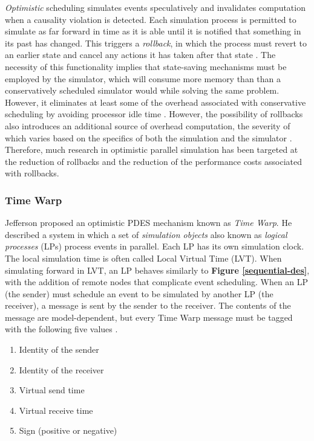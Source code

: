 \documentclass[11pt]{book}
\begin{document}
\textit{Optimistic} scheduling simulates events speculatively and invalidates
computation when a causality violation is detected. Each simulation process is
permitted to simulate as far forward in time as it is able until it is notified
that something in its past has changed. This triggers a \textit{rollback}, in
which the process must revert to an earlier state and cancel any actions it has
taken after that state \cite{nicol-93b}. The necessity of this functionality
implies that state-saving mechanisms must be employed by the simulator, which
will consume more memory than than a conservatively scheduled simulator would
while solving the same problem. However, it eliminates at least some of the
overhead associated with conservative scheduling by avoiding processor idle time
\cite{nicol-93b}. However, the possibility of rollbacks also introduces an
additional source of overhead computation, the severity of which varies based on
the specifics of both the simulation and the simulator
\cite{fujimoto-pdes}. Therefore, much research in optimistic parallel simulation
has been targeted at the reduction of rollbacks and the reduction of the
performance costs associated with rollbacks.

\subsubsection{\textbf{Time Warp}}
\label{time-warp}

Jefferson \cite{jefferson-85} proposed an optimistic PDES mechanism known as
\textit{Time Warp}. He described a system in which a set of \textit{simulation
  objects} also known as \textit{logical processes} (LPs) process events in
parallel. Each LP has its own simulation clock. The local simulation time is
often called Local Virtual Time (LVT). When simulating forward in LVT, an LP
behaves similarly to \textbf{Figure \ref{sequential-des}}, with the addition of
remote nodes that complicate event scheduling. When an LP (the sender) must schedule an event
to be simulated by another LP (the receiver), a message is sent by the sender to
the receiver. The contents of the message are model-dependent, but every Time
Warp message must be tagged with the following five values \cite{jefferson-85}.

\begin{enumerate}
  \item Identity of the sender
  \item Identity of the receiver
  \item Virtual send time
  \item Virtual receive time
  \item Sign (positive or negative)
\end{enumerate}
\end{document}
